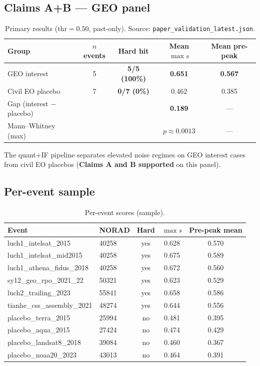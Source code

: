 \documentclass[11pt,a4paper]{article}
\begin{document}
\subsection{Claims A+B --- GEO panel}
\begin{table}[H]
\centering
\caption{Primary results (thr$=0.50$, past-only). Source: \texttt{paper\_validation\_latest.json}.}
\label{tab:geo}
\begin{tabular}{@{}lcccc@{}}
\toprule
Group & $n$ events & Hard hit & Mean $\max s$ & Mean pre-peak \\
\midrule
GEO interest & 5 & \textbf{5/5 (100\%)} & \textbf{0.651} & \textbf{0.567} \\
Civil EO placebo & 7 & \textbf{0/7 (0\%)} & 0.462 & 0.385 \\
\midrule
Gap (interest $-$ placebo) & & & \textbf{0.189} & --- \\
Mann--Whitney (max) & & & $p\approx 0.0013$ & --- \\
\bottomrule
\end{tabular}
\end{table}

The quant+IF pipeline separates elevated noise regimes on GEO interest cases from civil EO placebos (\textbf{Claims A and B supported} on this panel).

\subsection{Per-event sample}
\begin{table}[H]
\centering
\caption{Per-event scores (sample).}
\label{tab:events}
\scriptsize
\begin{tabular}{@{}llccc@{}}
\toprule
Event & NORAD & Hard & $\max s$ & Pre-peak mean \\
\midrule
luch1\_intelsat\_2015 & 40258 & yes & 0.628 & 0.570 \\
luch1\_intelsat\_mid2015 & 40258 & yes & 0.675 & 0.589 \\
luch1\_athena\_fidus\_2018 & 40258 & yes & 0.672 & 0.560 \\
sy12\_geo\_rpo\_2021\_22 & 50321 & yes & 0.623 & 0.529 \\
luch2\_trailing\_2023 & 55841 & yes & 0.658 & 0.586 \\
tianhe\_css\_assembly\_2021 & 48274 & yes & 0.644 & 0.556 \\
placebo\_terra\_2015 & 25994 & no & 0.481 & 0.395 \\
placebo\_aqua\_2015 & 27424 & no & 0.474 & 0.429 \\
placebo\_landsat8\_2018 & 39084 & no & 0.460 & 0.367 \\
placebo\_noaa20\_2023 & 43013 & no & 0.464 & 0.391 \\
\bottomrule
\end{tabular}
\end{table}
\end{document}
